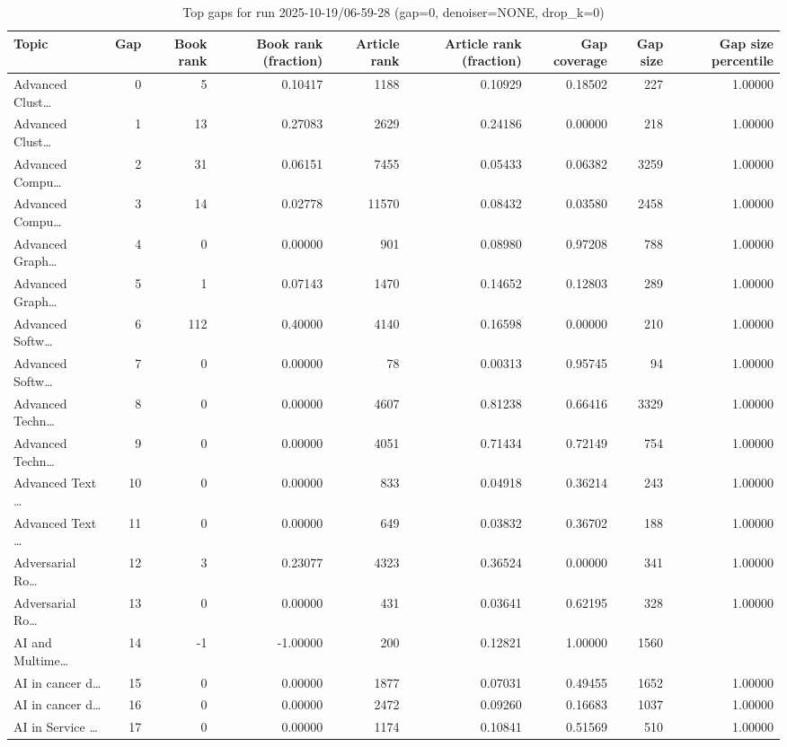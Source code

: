 \begin{table}
\caption{Top gaps for run 2025-10-19/06-59-28 (gap=0, denoiser=NONE, drop\_k=0)}
\label{tab:best_run_gap0_2025_10_19_06_59_28}
\begin{tabular}{lrrrrrrrr}
\toprule
Topic & Gap & Book rank & Book rank (fraction) & Article rank & Article rank (fraction) & Gap coverage & Gap size & Gap size percentile \\
\midrule
Advanced Clust… & 0 & 5 & 0.10417 & 1188 & 0.10929 & 0.18502 & 227 & 1.00000 \\
Advanced Clust… & 1 & 13 & 0.27083 & 2629 & 0.24186 & 0.00000 & 218 & 1.00000 \\
Advanced Compu… & 2 & 31 & 0.06151 & 7455 & 0.05433 & 0.06382 & 3259 & 1.00000 \\
Advanced Compu… & 3 & 14 & 0.02778 & 11570 & 0.08432 & 0.03580 & 2458 & 1.00000 \\
Advanced Graph… & 4 & 0 & 0.00000 & 901 & 0.08980 & 0.97208 & 788 & 1.00000 \\
Advanced Graph… & 5 & 1 & 0.07143 & 1470 & 0.14652 & 0.12803 & 289 & 1.00000 \\
Advanced Softw… & 6 & 112 & 0.40000 & 4140 & 0.16598 & 0.00000 & 210 & 1.00000 \\
Advanced Softw… & 7 & 0 & 0.00000 & 78 & 0.00313 & 0.95745 & 94 & 1.00000 \\
Advanced Techn… & 8 & 0 & 0.00000 & 4607 & 0.81238 & 0.66416 & 3329 & 1.00000 \\
Advanced Techn… & 9 & 0 & 0.00000 & 4051 & 0.71434 & 0.72149 & 754 & 1.00000 \\
Advanced Text … & 10 & 0 & 0.00000 & 833 & 0.04918 & 0.36214 & 243 & 1.00000 \\
Advanced Text … & 11 & 0 & 0.00000 & 649 & 0.03832 & 0.36702 & 188 & 1.00000 \\
Adversarial Ro… & 12 & 3 & 0.23077 & 4323 & 0.36524 & 0.00000 & 341 & 1.00000 \\
Adversarial Ro… & 13 & 0 & 0.00000 & 431 & 0.03641 & 0.62195 & 328 & 1.00000 \\
AI and Multime… & 14 & -1 & -1.00000 & 200 & 0.12821 & 1.00000 & 1560 &  \\
AI in cancer d… & 15 & 0 & 0.00000 & 1877 & 0.07031 & 0.49455 & 1652 & 1.00000 \\
AI in cancer d… & 16 & 0 & 0.00000 & 2472 & 0.09260 & 0.16683 & 1037 & 1.00000 \\
AI in Service … & 17 & 0 & 0.00000 & 1174 & 0.10841 & 0.51569 & 510 & 1.00000 \\

\end{tabular}
\end{table}
